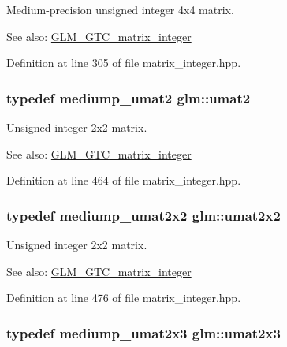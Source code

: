 Medium-precision unsigned integer 4x4 matrix. \begin{Desc}
\item[See also:]\hyperlink{group__gtc__matrix__integer}{GLM\_\-GTC\_\-matrix\_\-integer} \end{Desc}


Definition at line 305 of file matrix\_\-integer.hpp.\hypertarget{group__gtc__matrix__integer_ge2d45c058cfa0b60ab4df0cdda2d8516}{
\subsubsection[umat2]{\setlength{\rightskip}{0pt plus 5cm}typedef mediump\_\-umat2 {\bf glm::umat2}}}
\label{group__gtc__matrix__integer_ge2d45c058cfa0b60ab4df0cdda2d8516}


Unsigned integer 2x2 matrix. \begin{Desc}
\item[See also:]\hyperlink{group__gtc__matrix__integer}{GLM\_\-GTC\_\-matrix\_\-integer} \end{Desc}


Definition at line 464 of file matrix\_\-integer.hpp.\hypertarget{group__gtc__matrix__integer_gd3c997b31dd69bdb4787867e758ed48d}{
\subsubsection[umat2x2]{\setlength{\rightskip}{0pt plus 5cm}typedef mediump\_\-umat2x2 {\bf glm::umat2x2}}}
\label{group__gtc__matrix__integer_gd3c997b31dd69bdb4787867e758ed48d}


Unsigned integer 2x2 matrix. \begin{Desc}
\item[See also:]\hyperlink{group__gtc__matrix__integer}{GLM\_\-GTC\_\-matrix\_\-integer} \end{Desc}


Definition at line 476 of file matrix\_\-integer.hpp.\hypertarget{group__gtc__matrix__integer_g890ae28f9230794138b2c89f44ce3376}{
\subsubsection[umat2x3]{\setlength{\rightskip}{0pt plus 5cm}typedef mediump\_\-umat2x3 {\bf glm::umat2x3}}}
\label{group__gtc__matrix__integer_g890ae28f9230794138b2c89f44ce3376}


